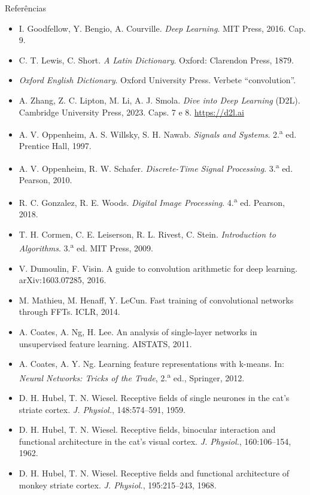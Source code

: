 \documentclass[aspectratio=169,11pt]{beamer}
\begin{document}
\begin{frame}[allowframebreaks]{Referências}
  \footnotesize
  \begin{itemize}
    \item I. Goodfellow, Y. Bengio, A. Courville. \emph{Deep Learning}. MIT Press, 2016. Cap. 9.
    \item C. T. Lewis, C. Short. \emph{A Latin Dictionary}. Oxford: Clarendon Press, 1879.
    \item \emph{Oxford English Dictionary}. Oxford University Press. Verbete ``convolution''.
    \item A. Zhang, Z. C. Lipton, M. Li, A. J. Smola. \emph{Dive into Deep Learning} (D2L). Cambridge University Press, 2023. Caps. 7 e 8. \url{https://d2l.ai}
    \item A. V. Oppenheim, A. S. Willsky, S. H. Nawab. \emph{Signals and Systems}. 2.\textsuperscript{a} ed. Prentice Hall, 1997.
    \item A. V. Oppenheim, R. W. Schafer. \emph{Discrete-Time Signal Processing}. 3.\textsuperscript{a} ed. Pearson, 2010.
    \item R. C. Gonzalez, R. E. Woods. \emph{Digital Image Processing}. 4.\textsuperscript{a} ed. Pearson, 2018.
    \item T. H. Cormen, C. E. Leiserson, R. L. Rivest, C. Stein. \emph{Introduction to Algorithms}. 3.\textsuperscript{a} ed. MIT Press, 2009.
    \item V. Dumoulin, F. Visin. A guide to convolution arithmetic for deep learning. arXiv:1603.07285, 2016.
    \item M. Mathieu, M. Henaff, Y. LeCun. Fast training of convolutional networks through FFTs. ICLR, 2014.
    \item A. Coates, A. Ng, H. Lee. An analysis of single-layer networks in unsupervised feature learning. AISTATS, 2011.
    \item A. Coates, A. Y. Ng. Learning feature representations with k-means. In: \emph{Neural Networks: Tricks of the Trade}, 2.\textsuperscript{a} ed., Springer, 2012.
    \item D. H. Hubel, T. N. Wiesel. Receptive fields of single neurones in the cat's striate cortex. \emph{J. Physiol.}, 148:574--591, 1959.
    \item D. H. Hubel, T. N. Wiesel. Receptive fields, binocular interaction and functional architecture in the cat's visual cortex. \emph{J. Physiol.}, 160:106--154, 1962.
    \item D. H. Hubel, T. N. Wiesel. Receptive fields and functional architecture of monkey striate cortex. \emph{J. Physiol.}, 195:215--243, 1968.

\end{itemize}
\end{frame}
\end{document}
